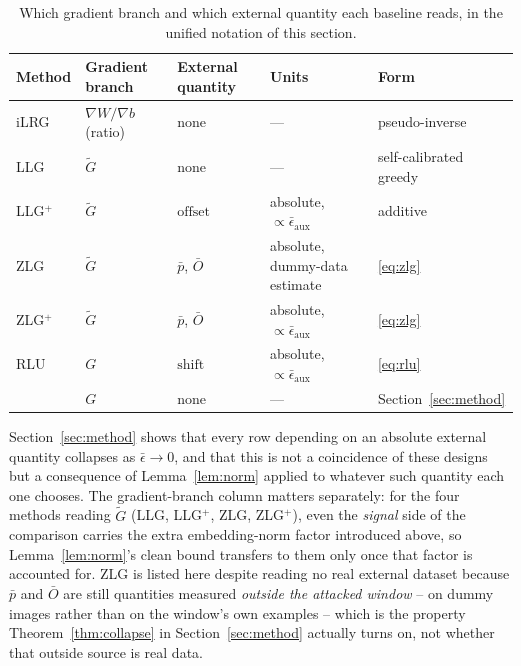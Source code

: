\begin{table}[t]
\centering
\caption{Which gradient branch and which external quantity each baseline
reads, in the unified notation of this section.}
\label{tab:baselines}
\begin{tabular}{@{}lllll@{}}
\toprule
Method & Gradient branch & External quantity & Units & Form \\
\midrule
iLRG      & $\nabla W/\nabla b$ (ratio) & none            & ---                                        & pseudo-inverse \\
LLG       & $\widetilde G$              & none            & ---                                        & self-calibrated greedy \\
LLG$^+$   & $\widetilde G$              & $\mathrm{offset}$ & absolute, $\propto \bar\epsilon_{\mathrm{aux}}$ & additive \\
ZLG       & $\widetilde G$              & $\bar p$, $\bar O$ & absolute, dummy-data estimate            & \eqref{eq:zlg} \\
ZLG$^+$   & $\widetilde G$              & $\bar p$, $\bar O$ & absolute, $\propto \bar\epsilon_{\mathrm{aux}}$ & \eqref{eq:zlg} \\
RLU       & $G$                         & $\mathrm{shift}$  & absolute, $\propto \bar\epsilon_{\mathrm{aux}}$ & \eqref{eq:rlu} \\
\ourmethod{} & $G$                      & none            & ---                                        & Section~\ref{sec:method} \\
\bottomrule
\end{tabular}
\end{table}

Section~\ref{sec:method} shows that every row depending on an absolute
external quantity collapses as $\bar\epsilon \to 0$, and that this is not
a coincidence of these designs but a consequence of Lemma~\ref{lem:norm}
applied to whatever such quantity each one chooses. The gradient-branch
column matters separately: for the four methods reading $\widetilde G$
(LLG, LLG$^+$, ZLG, ZLG$^+$), even the \emph{signal} side of the
comparison carries the extra embedding-norm factor introduced above, so
Lemma~\ref{lem:norm}'s clean bound transfers to them only once that
factor is accounted for. ZLG is listed here despite reading no real
external dataset because $\bar p$ and $\bar O$ are still quantities
measured \emph{outside the attacked window} -- on dummy images rather
than on the window's own examples -- which is the property
Theorem~\ref{thm:collapse} in Section~\ref{sec:method} actually turns on,
not whether that outside source is real data.
